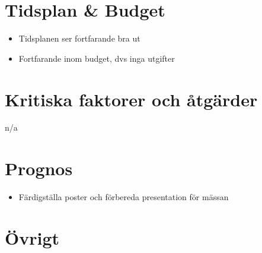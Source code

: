 \section{Tidsplan \& Budget}
\begin{itemize}
\item Tidsplanen ser fortfarande bra ut
\item Fortfarande inom budget, dvs inga utgifter
\end{itemize}
\section{Kritiska faktorer och åtgärder}
n/a
\section{Prognos}
\begin{itemize}
\item Färdigställa poster och förbereda presentation för mässan
\end{itemize}
\section{Övrigt}